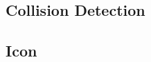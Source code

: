 \documentclass[11pt]{article}
\begin{document}
%
		\subsection{Collision Detection}		
		
				
		\subsection{Icon}
		



		
		

		
	
\end{document}
